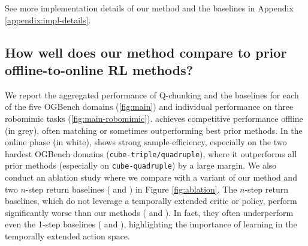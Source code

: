 See more implementation details of our method and the baselines in Appendix \ref{appendix:impl-details}.



















\subsection{How well does our method compare to prior offline-to-online RL methods?}
\label{sec:results-analysis}
We report the aggregated performance of Q-chunking and the baselines for each of the five OGBench domains (\cref{fig:main}) and individual performance on three robomimic tasks (\cref{fig:main-robomimic}).  achieves competitive performance offline (in grey), often matching or sometimes outperforming best prior methods. In the online phase (in white),  shows strong sample-efficiency, especially on the two hardest OGBench domains (\texttt{cube-triple/quadruple}), where it outperforms all prior methods (especially on \texttt{cube-quadruple}) by a large margin. We also conduct an ablation study where we compare  with a variant of our method  and two $n$-step return baselines ( and ) in Figure \ref{fig:ablation}. The $n$-step return baselines, which do not leverage a temporally extended critic or policy, perform significantly worse than our methods ( and ). In fact, they often underperform even the 1-step baselines ( and ), highlighting the importance of learning in the temporally extended action space.















